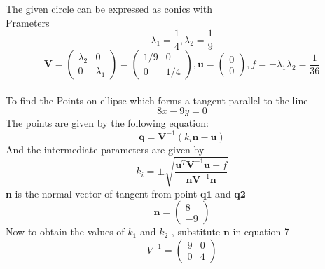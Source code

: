 \documentclass[journal,10pt,twocolumn]{article}
\let\vec\mathbf
\newcommand{\myvec}[1]{\ensuremath{\begin{pmatrix}#1\end{pmatrix}}}
\begin{document}
 The given circle can be expressed as conics with \\Prameters
\begin{equation}
	\lambda_1 = \frac{1}{4} , \lambda_2 = \frac{1}{9}
\end{equation}
\begin{equation}
	\vec{V} = \myvec{\lambda_2&0\\0&\lambda_1} = \myvec{1/9&0\\0&1/4} , \vec{u} = \myvec{0\\0} , f = -\lambda_1\lambda_2 = \frac{1}{36}
\end{equation}
\\
To find the Points on ellipse which forms a tangent parallel to the line 
\begin{equation}
	8x - 9y = 0
\end{equation}
The points are given by the following equation:
\begin{equation}
	\vec{q} = \vec{V}^{-1}(k_i\vec{n}-\vec{u})
\end{equation}
And the intermediate parameters are given by 
\begin{equation}
	k_i = \pm\sqrt{\frac{\vec{u}^T\vec{V}^{-1}\vec{u}-f}{\vec{n}\vec{V}^{-1}\vec{n}}}
\end{equation} 
$\vec{n}$ is the normal vector of tangent from point $\vec{q1}$ and $\vec{q2}$ 
\begin{equation}
	\vec{n} = \myvec{8\\-9}
\end{equation}
Now to obtain the values of $k_1$ and $k_2$ , substitute $\vec{n}$ in equation 7
\begin{equation}
	V^{-1} = \myvec{9&0\\0&4}
\end{equation}
\end{document}
